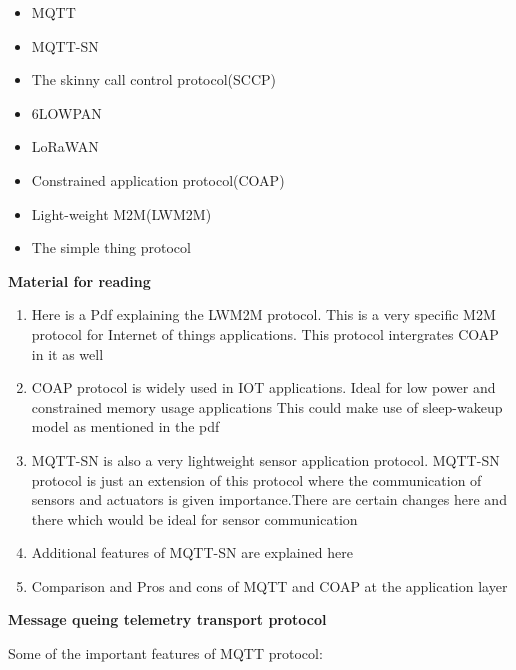 \documentclass[16pt]{article}
\begin{document}
\begin{itemize}

\item
  MQTT
\item
  MQTT-SN
\item
  The skinny call control protocol(SCCP)
\item
  6LOWPAN
\item
  LoRaWAN
\item
  Constrained application protocol(COAP)
\item
  Light-weight M2M(LWM2M)
\item
  The simple thing protocol
\end{itemize}

\textbf{Material for reading}

\begin{enumerate}

\item
  Here is a Pdf explaining the LWM2M protocol. This is a very specific
  M2M protocol for Internet of things
  applications.%
  This protocol intergrates COAP in it as well
\item
  COAP protocol is widely used in IOT applications. Ideal for low power
  and constrained memory usage applications
  This could make use of sleep-wakeup model as mentioned in the pdf
\item
  MQTT-SN is also a very lightweight sensor application protocol.
  MQTT-SN protocol is just an extension of this protocol where the
  communication of sensors and actuators is given importance.There are
  certain changes here and there which would be ideal for sensor
  communication
\item
  Additional features of MQTT-SN are explained here
\item
  Comparison and Pros and cons of MQTT and COAP at the application layer
\end{enumerate}

{\LARGE{\textbf{Message queing telemetry transport protocol}}}

Some of the important features of MQTT protocol:
\end{document}
